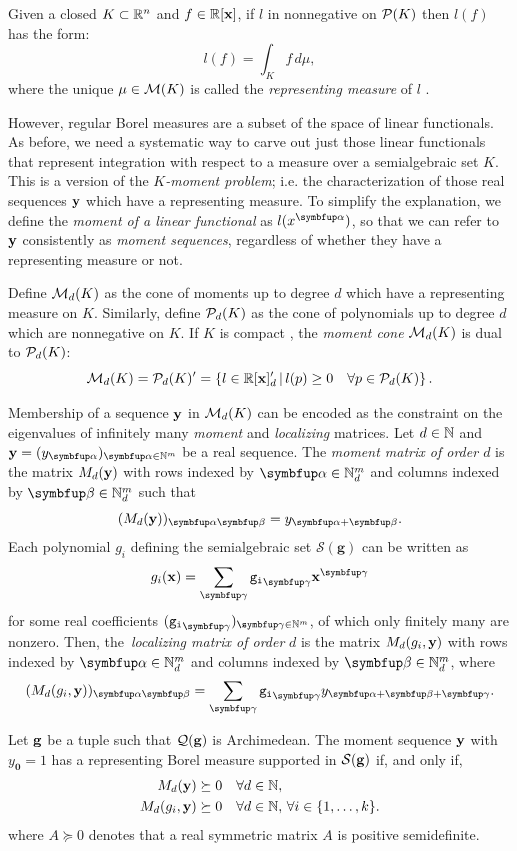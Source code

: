 Given a closed $K \subset\mathbb{R}^n$ and $f\in\mathbb{R}[\mathbf{x}]$, if $l$ in nonnegative on $\mathcal{P}(K)$ then $l(f)$ has the form:
\[
l(f) = \int_K f \,d\mu,
\]
where the unique $\mu\in\mathcal{M}(K)$ is called the \emph{representing measure} of $l$ \cite{haviland35:momentum}.

However, regular Borel measures are a subset of the space of linear functionals. As before, we need a systematic way to carve out just those linear functionals that represent integration with respect to a measure over a semialgebraic set $K$. This is a version of the \emph{$K$-moment problem}; i.e. the characterization of those real sequences $\mathbf{y}$ which have a representing measure. To simplify the explanation, we define the \emph{moment of a linear functional} as $l(x^{\balpha})$, so that we can refer to $\mathbf{y}$ consistently as \emph{moment sequences}, regardless of whether they have a representing measure or not.

Define $\mathcal{M}_d(K)$ as the cone of moments up to degree $d$ which have a representing measure on $K$. Similarly, define $\mathcal{P}_d(K)$ as the cone of polynomials up to degree $d$ which are nonnegative on $K$. If $K$ is compact \cite{haviland35:momentum}, the \emph{moment cone} $\mathcal{M}_d(K)$ is dual to $\mathcal{P}_d(K)$:
\[
    \mathcal{M}_d(K)=\mathcal{P}_d(K)'= \left\{l \in \mathbb{R}[\mathbf{x}]_d' \,\middle|\, l(p)\ge 0 \quad \forall p\in \mathcal{P}_d(K) \right\}.
\]

Membership of a sequence $\mathbf{y}$ in $\mathcal{M}_d(K)$ can be encoded as the constraint on the eigenvalues of infinitely many \emph{moment} and \emph{localizing} matrices. Let $d\in \mathbb{N}$ and $\by=(y_{\balpha})_{\balpha\in\N^{m}}$ be a real sequence. The \emph{moment matrix of order $d$} is the matrix $M_d(\mathbf{y})$ with rows indexed by $\balpha\in\N^{m}_d$ and columns indexed by $\bbeta\in\N^{m}_d$ such that
\[
(M_d(\by))_{\balpha\bbeta}=y_{\balpha+\bbeta}.
\]
Each polynomial $g_i$ defining the semialgebraic set $\mathcal{S}(\mathbf{g})$ can be written as
\[
g_{i}(\bx)=\sum_{\bgamma}\coeff{g_i}_{\bgamma}\bx^{\bgamma}
\]
for some real coefficients $(\coeff{g_i}_{\bgamma})_{\bgamma\in\N^{m}}$, of which only finitely many are nonzero. Then, the~\emph{localizing matrix of order} $d$ is the matrix $M_d(g_{i},\mathbf{y})$ with rows indexed by $\balpha\in\N^{m}_d$ and columns indexed by $\bbeta\in\N^{m}_d$, where
\[
(M_d(g_{i},\by))_{\balpha\bbeta}=\sum_{\bgamma}\coeff{g_i}_{\bgamma}y_{\balpha+\bbeta+\bgamma}.
\]

\begin{theorem}
Let $\mathbf{g}$ be a tuple such that $\mathcal{Q}(\mathbf{g})$ is Archimedean. The moment sequence $\mathbf{y}$ with $y_\mathbf{0}=1$ has a representing Borel measure supported in $\mathcal{S}(\mathbf{g})$ if, and only if,
\begin{equation}\label{moment}
    \begin{aligned}
M_d(\mathbf{y}) &\succeq 0 \quad \forall d \in \mathbb{N},\\
M_d(g_{i}, \mathbf{y}) &\succeq 0 \quad \forall d \in \mathbb{N},\,\forall i\in \{1,\dots,k\}.
    \end{aligned}
\end{equation}
where $A\succeq 0$ denotes that a real symmetric matrix $A$ is positive semidefinite.
\end{theorem}

